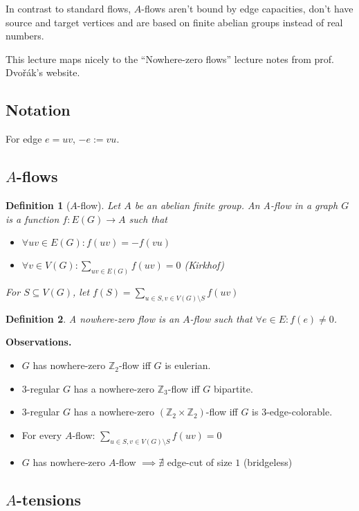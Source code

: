 \documentclass{article}
\newtheorem*{definition}{Definition}
\newcommand{\Z}{\mathbb{Z}}
\begin{document}
\noindent
In contrast to standard flows, $A$-flows aren't bound by edge capacities, don't
have source and target vertices and are based on finite abelian groups instead
of real numbers.

This lecture maps nicely to the \enquote{Nowhere-zero flows} lecture notes from
prof. Dvořák's website.

\subsection*{Notation}
For edge $e = uv$, $-e := vu$.

\subsection*{$A$-flows}

\begin{definition}[$A$-flow]
	Let $A$ be an abelian finite group. An \emph{A-flow} in a graph $G$ is
	a function $f: E(G) \rightarrow A$ such that
	\begin{itemize}
		\item $\forall uv \in E(G): f(uv) = -f(vu)$
		\item $\forall v \in V(G): \sum_{uv \in E(G)}{f(uv)} = 0$
			(Kirkhof)
	\end{itemize}
	For $S \subseteq V(G)$, let $f(S) = \sum_{u \in S, v \in V(G) \setminus
	S}{f(uv)}$
\end{definition}

\begin{definition}
	A \emph{nowhere-zero flow} is an $A$-flow such that $\forall e \in E:
	f(e) \neq 0$.
\end{definition}

\noindent
\textbf{Observations.}
\begin{itemize}
	\item $G$ has nowhere-zero $\Z_2$-flow iff $G$ is eulerian.
	\item $3$-regular $G$ has a nowhere-zero $\Z_3$-flow iff $G$
		bipartite.
	\item $3$-regular $G$ has a nowhere-zero $(\Z_2 \times \Z_2)$-flow iff
		$G$ is $3$-edge-colorable.
	\item For every $A$-flow: $\sum_{u \in S, v \in V(G) \setminus S}f(uv)
		= 0$
	\item $G$ has nowhere-zero $A$-flow $\implies \nexists$ edge-cut of
		size $1$ (bridgeless)
\end{itemize}

\subsection*{$A$-tensions}
\end{document}
